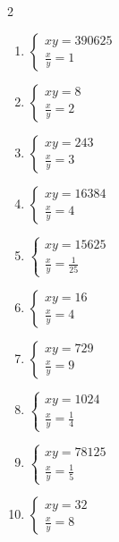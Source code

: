 \documentclass[12pt,a4paper]{article}
\begin{document}
\begin{multicols}{2}
\begin{enumerate}[leftmargin=*, itemsep=6pt]
\item \(\begin{cases} xy=390625\\ \frac{x}{y}=1\end{cases}\)

\item \(\begin{cases} xy=8\\ \frac{x}{y}=2\end{cases}\)

\item \(\begin{cases} xy=243\\ \frac{x}{y}=3\end{cases}\)

\item \(\begin{cases} xy=16384\\ \frac{x}{y}=4\end{cases}\)

\item \(\begin{cases} xy=15625\\ \frac{x}{y}=\frac{1}{25}\end{cases}\)

\item \(\begin{cases} xy=16\\ \frac{x}{y}=4\end{cases}\)

\item \(\begin{cases} xy=729\\ \frac{x}{y}=9\end{cases}\)

\item \(\begin{cases} xy=1024\\ \frac{x}{y}=\frac{1}{4}\end{cases}\)

\item \(\begin{cases} xy=78125\\ \frac{x}{y}=\frac{1}{5}\end{cases}\)

\item \(\begin{cases} xy=32\\ \frac{x}{y}=8\end{cases}\)

\end{enumerate}
\end{multicols}
\newpage
\end{document}
